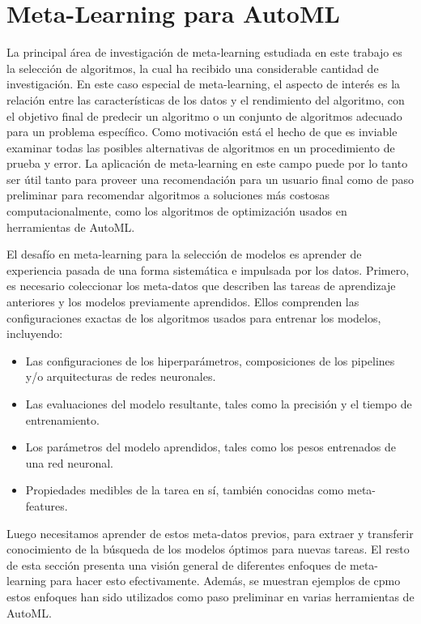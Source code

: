 \section{Meta-Learning para AutoML}\label{sec:metalearning-automl}


La principal área de investigación de meta-learning estudiada en este trabajo es la selección de algoritmos, la cual ha recibido una considerable cantidad de investigación. En este caso especial de meta-learning, el aspecto de interés es la relación entre las características de los datos y el rendimiento del algoritmo, con el objetivo final de predecir un algoritmo o un conjunto de algoritmos adecuado para un problema específico. Como motivación está el hecho de que es inviable examinar todas las posibles alternativas de algoritmos en un procedimiento de prueba y error. La aplicación de meta-learning en este campo puede por lo tanto ser útil tanto para proveer una recomendación para un usuario final como de paso preliminar para recomendar algoritmos a soluciones más costosas computacionalmente, como los algoritmos de optimización usados en herramientas de AutoML. 


El desafío en meta-learning para la selección de modelos es aprender de experiencia pasada de una forma sistemática e impulsada por los datos. Primero, es necesario coleccionar los meta-datos que describen las tareas de aprendizaje anteriores y los modelos previamente aprendidos. Ellos comprenden las configuraciones exactas de los algoritmos usados para entrenar los modelos, incluyendo:

\begin{itemize}
	\item Las configuraciones de los hiperparámetros, composiciones de los pipelines y/o arquitecturas de redes neuronales.
	\item Las evaluaciones del modelo resultante, tales como la precisión y el tiempo de entrenamiento.
	\item Los parámetros del modelo aprendidos, tales como los pesos entrenados de una red neuronal.
	\item Propiedades medibles de la tarea en sí, también conocidas como meta-features.
\end{itemize}

Luego necesitamos aprender de estos meta-datos previos, para extraer y transferir conocimiento de la búsqueda de los modelos óptimos para nuevas tareas. El resto de esta sección presenta una visión general de diferentes enfoques de meta-learning para hacer esto efectivamente. Además, se muestran ejemplos de cpmo estos enfoques han sido utilizados como paso preliminar en varias herramientas de AutoML.

